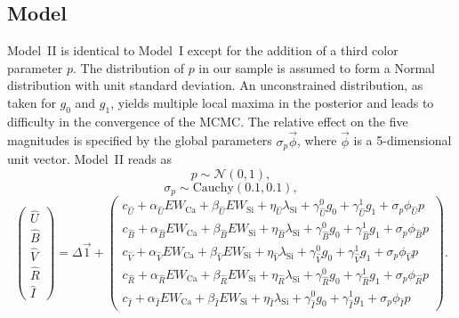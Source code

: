 \documentclass[trackchanges]{aastex62}   	%
\begin{document}
\subsection{Model}
\label{modelIImodel:sec}
Model~II is identical to Model~I except for the 
addition of a third color parameter $p$.  The distribution of $p$ in our sample
is assumed to form a Normal distribution with unit standard deviation.  An unconstrained distribution,
as taken for $g_0$ and $g_1$, yields multiple local maxima in the posterior and leads to difficulty in the convergence of the MCMC.
The relative effect on the five magnitudes is specified by the global parameters 
$\sigma_p\vec{\phi}$, where $\vec{\phi}$ is a 5-dimensional unit vector.
Model~II reads as
\begin{equation}
p  \sim \mathcal{N}(0,1 ),
\end{equation}
\begin{equation}
\sigma_p  \sim \text{Cauchy}(0.1,0.1),
\end{equation}
\begin{equation}
\begin{pmatrix}
{\hat{U}}\\{\hat{B}}\\{\hat{V}}\\{\hat{R}}\\{\hat{I}}
\end{pmatrix}
=
\Delta  \vec{1} +
\begin{pmatrix}
c_{\hat{U}}+\alpha_{\hat{U}} EW_{\mathrm{Ca}} + \beta_{\hat{U}} EW_{\mathrm{Si}} + \eta_{\hat{U}} \lambda_{\mathrm{Si}}+\gamma^0_{{\hat{U}}} g_0 +\gamma^1_{{\hat{U}}} g_1  + \sigma_p\phi_{\hat{U}} p\\
c_{\hat{B}}+\alpha_{\hat{B}} EW_{\mathrm{Ca}} + \beta_{\hat{B}} EW_{\mathrm{Si}} + \eta_{\hat{B}} \lambda_{\mathrm{Si}} +\gamma^0_{{\hat{B}}} g_0 +\gamma^1_{{\hat{B}}} g_1  + \sigma_p\phi_{\hat{B}} p\\
c_{\hat{V}}+\alpha_{\hat{V}} EW_{\mathrm{Ca}} + \beta_{\hat{V}} EW_{\mathrm{Si}} + \eta_{\hat{V}} \lambda_{\mathrm{Si}} +\gamma^0_{{\hat{V}}} g_0 +\gamma^1_{{\hat{V}}} g_1 + \sigma_p\phi_{\hat{V}}  p\\
c_{\hat{R}}+\alpha_{\hat{R}} EW_{\mathrm{Ca}} + \beta_{\hat{R}} EW_{\mathrm{Si}} + \eta_{\hat{R}} \lambda_{\mathrm{Si}} +\gamma^0_{{\hat{R}}} g_0 +\gamma^1_{{\hat{R}}} g_1 + \sigma_p\phi_{\hat{R}} p\\
c_{\hat{I}}+\alpha_{\hat{I}} EW_{\mathrm{Ca}} + \beta_{\hat{I}} EW_{\mathrm{Si}}+ \eta_{\hat{I}} \lambda_{\mathrm{Si}}+\gamma^0_{{\hat{I}}} g_0 +\gamma^1_{{\hat{I}}} g_1 + \sigma_p\phi_{\hat{I}}  p
\end{pmatrix}.
\label{ewsiv2:eqn}
\end{equation}
\end{document}
